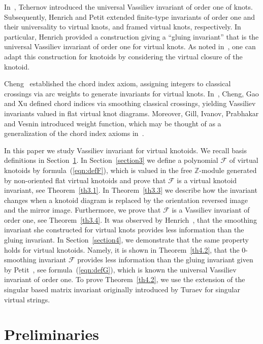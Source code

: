 \documentclass[11pt]{amsart}
\theoremstyle{noparens}
\numberwithin{equation}{section}
\numberwithin{equation}{section}
\begin{document}
In~\cite{Tch}, Tchernov introduced the universal Vassiliev invariant of order one of knots. Subsequently, Henrich \cite{Hen} and Petit \cite{Pet} extended finite-type invariants of order one and their universality to virtual knots, and framed virtual knots, respectively. In particular, Henrich provided a  construction giving a ``gluing invariant'' that is the universal Vassiliev invariant of order one for virtual knots. As noted in~\cite[Remark 7.9]{MLK}, one can adapt this construction for knotoids by considering the virtual closure of the knotoid.

Cheng~\cite{Che} established the chord index axiom, assigning integers to classical crossings via arc weights to generate invariants for virtual knots. In~\cite{CGX}, Cheng, Gao and Xu defined chord indices via smoothing classical crossings, yielding Vassiliev invariants valued in flat virtual knot diagrams. Moreover, Gill, Ivanov, Prabhakar and Vesnin introduced weight function, which may be thought of as a generalization of the chord index axioms in~\cite{GIPV}.  

In this paper we study Vassiliev invariant for virtual knotoids. We recall basis definitions in Section~\ref{section2}. In Section~\ref{section3} we define a polynomial $\mathcal{F}$ of virtual knotoids by formula~(\ref{eqn:defF}), which is valued in the free $\mathbb Z$-module generated by non-oriented flat virtual knotoids and prove that $\mathcal{F}$ is a virtual knotoid invariant, see Theorem~\ref{th3.1}. In Theorem~\ref{th3.3} we describe how the invariant changes when a knotoid diagram is replaced by the orientation reversed image and the mirror image. Furthermore, we prove that $\mathcal{F}$ is a Vassiliev invariant of order one, see Theorem~\ref{th3.4}. It was observed by Henrich~\cite[Th.~3.11]{Hen}, that the smoothing invariant she constructed for virtual knots provides less information than the gluing invariant. In Section~\ref{section4}, we demonstrate that the same property holds for virtual knotoids. Namely, it is shown in Theorem~\ref{th4.2}, that the $0$-smoothing invariant $\mathcal{F}$ provides less information than the gluing invariant given by Petit~\cite{Pet}, see formula~(\ref{eqn:defG}), which is known the universal Vassiliev invariant of order one. To prove Theorem~\ref{th4.2}, we use the extension of the singular based matrix invariant originally introduced by Turaev for singular virtual strings.

\section{Preliminaries} \label{section2}
\end{document}
